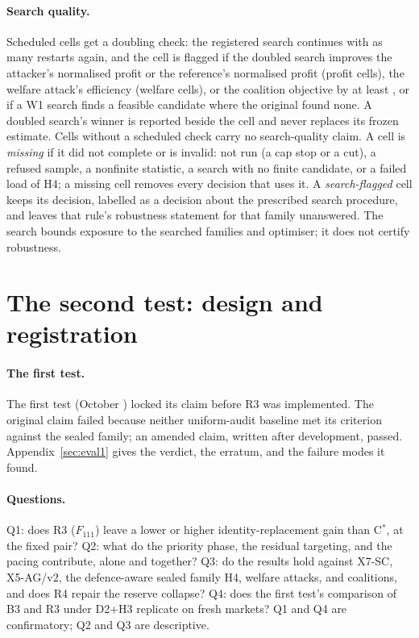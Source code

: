 \documentclass[11pt]{article}
\begin{document}
\paragraph{Search quality.} Scheduled cells get a doubling check: the registered search continues with as many restarts again, and the cell is flagged if the doubled search improves the attacker's normalised profit or the reference's normalised profit (profit cells), the welfare attack's efficiency (welfare cells), or the coalition objective by at least , or if a W1 search finds a feasible candidate where the original found none. A doubled search's winner is reported beside the cell and never replaces its frozen estimate. Cells without a scheduled check carry no search-quality claim. A cell is \emph{missing} if it did not complete or is invalid: not run (a cap stop or a cut), a refused sample, a nonfinite statistic, a search with no finite candidate, or a failed load of H4; a missing cell removes every decision that uses it. A \emph{search-flagged} cell keeps its decision, labelled as a decision about the prescribed search procedure, and leaves that rule's robustness statement for that family unanswered. The search bounds exposure to the searched families and optimiser; it does not certify robustness.

\section{The second test: design and registration}\label{sec:design}
\paragraph{The first test.} The first test (October ) locked its claim before R3 was implemented. The original claim failed because neither uniform-audit baseline met its criterion against the sealed family; an amended claim, written after development, passed. Appendix~\ref{sec:eval1} gives the verdict, the erratum, and the failure modes it found.

\paragraph{Questions.} Q1: does R3 ($F_{111}$) leave a lower or higher identity-replacement gain than C$^*$, at the fixed pair? Q2: what do the priority phase, the residual targeting, and the pacing contribute, alone and together? Q3: do the results hold against X7-SC, X5-AG/v2, the defence-aware sealed family H4, welfare attacks, and coalitions, and does R4 repair the reserve collapse? Q4: does the first test's comparison of B3 and R3 under D2+H3 replicate on fresh markets? Q1 and Q4 are confirmatory; Q2 and Q3 are descriptive.
\end{document}
